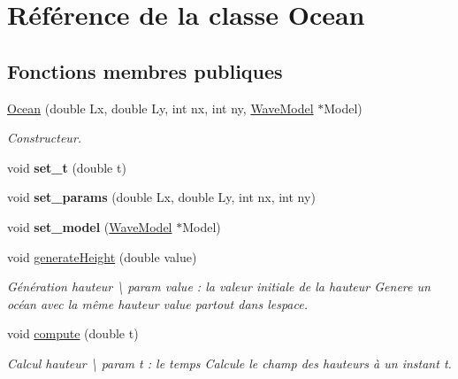 \hypertarget{class_ocean}{}\section{Référence de la classe Ocean}
\label{class_ocean}
\subsection*{Fonctions membres publiques}
\begin{DoxyCompactItemize}
\item 
\hyperlink{class_ocean_a5bf2686e16107378f2a934941ea3a085}{Ocean} (double Lx, double Ly, int nx, int ny, \hyperlink{class_wave_model}{Wave\+Model} $\ast$Model)
\begin{DoxyCompactList}\small\item\em Constructeur. \end{DoxyCompactList}\item 
\mbox{\label{class_ocean_aeecea110bc6527de046f41c94a3c0a83}} 
void {\bfseries set\+\_\+t} (double t)
\item 
\mbox{\label{class_ocean_aaa44e553e45f6c7f1cbc9c005068655f}} 
void {\bfseries set\+\_\+params} (double Lx, double Ly, int nx, int ny)
\item 
\mbox{\label{class_ocean_afc6a1506cf7c4f663ad34fff663febd0}} 
void {\bfseries set\+\_\+model} (\hyperlink{class_wave_model}{Wave\+Model} $\ast$Model)
\item 
\mbox{\label{class_ocean_ac78947768292df75ce929d4845123d01}} 
void \hyperlink{class_ocean_ac78947768292df75ce929d4845123d01}{generate\+Height} (double value)
\begin{DoxyCompactList}\small\item\em Génération hauteur \textbackslash{} param value \+: la valeur initiale de la hauteur Genere un océan avec la même hauteur value partout dans l\textquotesingle{}espace. \end{DoxyCompactList}\item 
\mbox{\label{class_ocean_aeaf68def6babcd8963ed8df3b0a2df35}} 
void \hyperlink{class_ocean_aeaf68def6babcd8963ed8df3b0a2df35}{compute} (double t)
\begin{DoxyCompactList}\small\item\em Calcul hauteur \textbackslash{} param t \+: le temps Calcule le champ des hauteurs à un instant t. \end{DoxyCompactList}\item 

\end{DoxyCompactItemize}
